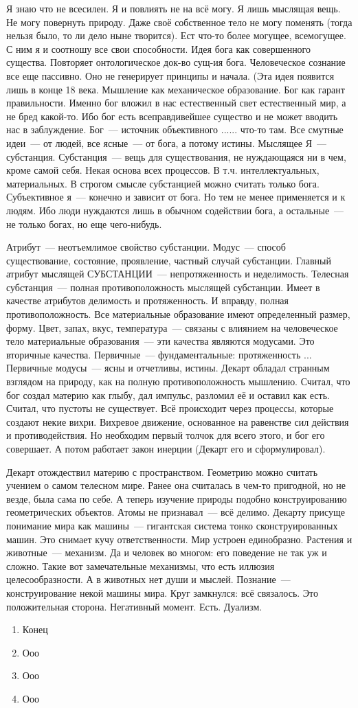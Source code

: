 Я знаю что не всесилен. Я и повлиять не на всё могу. Я лишь мыслящая вещь. Не могу повернуть природу. Даже своё собственное тело не могу поменять (тогда нельзя было, то ли дело ныне творится). Ест  что-то более могущее, всемогущее. С ним я и соотношу все свои способности. Идея бога как совершенного существа. Повторяет онтологическое док-во сущ-ия бога.
Человеческое сознание все еще пассивно. Оно не генерирует принципы и начала. (Эта идея появится лишь в конце 18 века. Мышление как механическое образование. Бог как гарант правильности. Именно бог вложил в нас естественный свет естественный мир, а не бред какой-то. Ибо бог есть всеправдивейшее существо и не может вводить нас в заблуждение. Бог~--- источник объективного ...... что-то там.
Все смутные идеи~--- от людей, все ясные~--- от бога, а потому истины. Мыслящее Я~--- субстанция.
Субстанция~--- вещь для существования, не нуждающаяся ни в чем, кроме самой себя. Некая основа всех процессов. В т.ч. интеллектуальных, материальных. В строгом смысле субстанцией можно считать только бога. Субъективное я~--- конечно и зависит от бога. Но тем не менее применяется и к людям. Ибо люди нуждаются лишь в обычном содействии бога, а остальные~--- не только богах, но еще чего-нибудь.

Атрибут~--- неотъемлимое свойство субстанции. Модус~--- способ существование, состояние, проявление, частный случай субстанции. Главный атрибут мыслящей СУБСТАНЦИИ~--- непротяженность и неделимость. Телесная субстанция~--- полная противоположность мыслящей субстанции. Имеет в качестве атрибутов делимость и протяженность. И вправду, полная противоположность. Все материальные образование имеют определенный размер, форму. Цвет, запах, вкус, температура~--- связаны с влиянием на человеческое тело материальные образования~--- эти качества являются модусами. Это вторичные качества. Первичные~--- фундаментальные: протяженность ...
Первичные модусы~--- ясны и отчетливы, истины.
Декарт обладал странным взглядом на природу, как на полную противоположность мышлению. Считал, что бог создал материю как глыбу, дал импульс, разломил её и оставил как есть. Считал, что пустоты не существует. Всё происходит через процессы, которые создают некие вихри. Вихревое движение, основанное на равенстве сил действия и противодействия. Но необходим первый толчок для всего этого, и бог его совершает. А потом работает закон инерции (Декарт его и сформулировал).

Декарт отождествил материю с пространством. Геометрию можно считать учением о самом телесном мире. Ранее она считалась в чем-то пригодной, но не везде, была сама по себе. А теперь изучение природы подобно конструированию геометрических объектов. Атомы не признавал~--- всё делимо. Декарту присуще понимание мира как машины~--- гигантская система тонко сконструированных машин. Это снимает кучу ответственности. Мир устроен единобразно. Растения и животные~--- механизм. Да и человек во многом: его поведение не так уж и сложно. Такие вот замечательные механизмы, что есть иллюзия целесообразности. А в животных нет души и мыслей. Познание~--- конструирование некой  машины мира. Круг замкнулся: всё связалось. Это положительная сторона.
Негативный момент. Есть. Дуализм.

\begin{enumerate}
	\item Конец
	\item Ооо
	\item Ооо
	\item Ооо
\end{enumerate}
